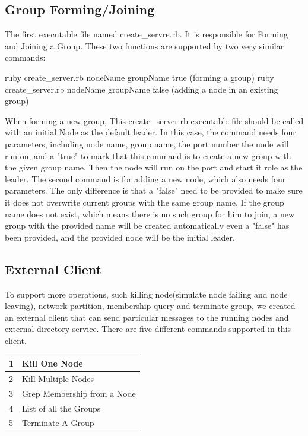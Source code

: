 \documentclass[a4paper,11pt]{article}
\begin{document}
\subsection{Group Forming/Joining}
The first executable file named create\_servre.rb. It is responsible for Forming and Joining a Group. These two functions are supported by two very similar commands:
\begin{outline}
\1 ruby create\_server.rb nodeName groupName true (forming a group)
\1 ruby create\_server.rb nodeName groupName false (adding a node in an existing group)
\end{outline}
When forming a new group, This create\_server.rb executable file should be called with an initial Node as the default leader. In this case, the command needs four parameters, including node name, group name, the port number the node will run on, and a "true" to mark that this command is to create a new group with the given group name. Then the node will run on the port and start it role as the leader.
The second command is for adding a new node, which also needs four parameters. The only difference is that a "false" need to be provided to make sure it does not overwrite current groups with the same group name. If the group name does not exist, which means there is no such group for him to join, a new group with the provided name will be created automatically even a "false" has been provided, and the provided node will be the initial leader.
\subsection{External Client}
To support more operations, such killing node(simulate node failing and node leaving), network partition, membership query and terminate group, we created an external client that can send particular messages to the running nodes and external directory service. There are five different commands supported in this client.
\begin{center}
    \begin{tabular}{ | l | p{5cm} |} \hline
    1 & Kill One Node \\ \hline
    2 & Kill Multiple Nodes \\ \hline
    3 & Grep Membership from a Node \\ \hline
    4 & List of all the Groups \\ \hline
    5 & Terminate A Group \\ \hline
    \end{tabular}
\end{center}
\end{document}
